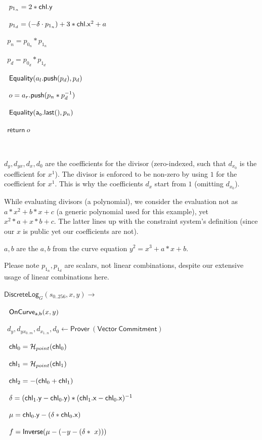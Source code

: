 \documentclass[]{article}
\begin{document}
$~~p_{1_n} = 2 * \mathsf{chl}\mathsf{.y}$

$~~p_{1_d} = (-\delta \cdot p_{1_n}) + 3 * \mathsf{chl}\mathsf{.x}^2 + a$

$~~p_n = p_{0_n} * p_{1_n}$

$~~p_d = p_{0_d} * p_{1_d}$

$~~\mathsf{Equality}(a_l\mathsf{.push}(p_d), p_d)$

$~~o = a_r\mathsf{.push}(p_n * p_d^{-1})$

$~~\mathsf{Equality}(\mathsf{a_o.last()}, p_n)$

$~~\mathsf{return} ~o$

\

$d_y, d_{yx}, d_x, d_0$ are the coefficients for the divisor (zero-indexed, such that $d_{x_0}$ is the coefficient for $x^1$). The divisor is enforced to be non-zero by using $1$ for the coefficient for $x^1$. This is why the coefficients $d_x$ start from $1$ (omitting $d_{x_0}$).

While evaluating divisors (a polynomial), we consider the evaluation not as $a * x^2 + b * x + c$ (a generic polynomial used for this example), yet $x^2 * a + x * b + c$. The latter lines up with the constraint system's definition (since our $x$ is public yet our coefficients are not).

$a, b$ are the $a, b$ from the curve equation $y^2 = x^3 + a * x + b$.

Please note $p_{1_n}, p_{1_d}$ are scalars, not linear combinations, despite our extensive usage of linear combinations here.

\pagebreak

\newcommand{\circuitin}{\leftarrow \mathsf{Prover ~(Vector ~Commitment)}}

\newcommand{\dlog}{\mathsf{DiscreteLog}}

$\dlog_G(s_{0..256}, x, y) \rightarrow$

$~~\mathsf{OnCurve_{a,b}}(x, y)$

$~~d_y, d_{yx_{0..m}}, d_{x_{1..n}}, d_0 \circuitin$

$~~\mathsf{chl}_0 = \mathcal{H}_{point}(\mathsf{chl}_0)$

$~~\mathsf{chl}_1 = \mathcal{H}_{point}(\mathsf{chl}_1)$

$~~\mathsf{chl}_2 = -(\mathsf{chl}_0 + \mathsf{chl}_1)$

$~~\delta = (\mathsf{chl}_1\mathsf{.y} - \mathsf{chl}_0\mathsf{.y}) * (\mathsf{chl}_1\mathsf{.x} - \mathsf{chl}_0\mathsf{.x})^{-1}$

$~~\mu = \mathsf{chl}_0\mathsf{.y} - (\delta * \mathsf{chl}_0\mathsf{.x})$

$~~f = \mathsf{Inverse}(\mu - (-y - (\delta * ~x)))$
\end{document}
